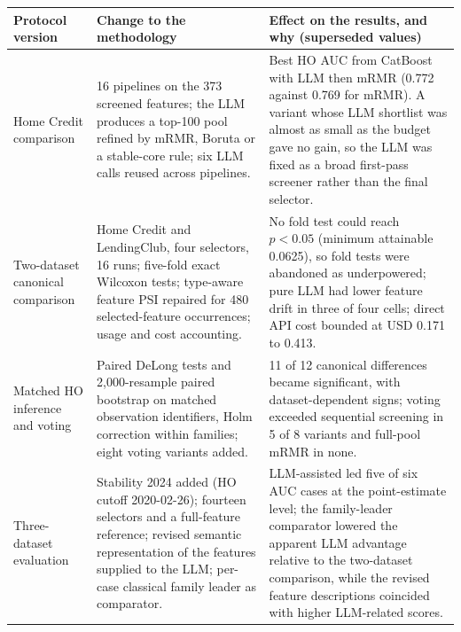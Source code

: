 \documentclass[final,5p,twocolumn]{elsarticle}
\providecommand{\DIFaddbeginFL}{} %
\providecommand{\DIFdelendFL}{} %
\begin{document}
\begin{table}[htbp]
\begin{threeparttable}
\DIFdelendFL \DIFaddbeginFL \label{tab:stages}
\begin{tabular}{@{}L{27mm}L{\dimexpr(\textwidth-27mm-4\tabcolsep)/2\relax}L{\dimexpr(\textwidth-27mm-4\tabcolsep)/2\relax}@{}}
\toprule
Protocol version & Change to the methodology & Effect on the results, and why (superseded values) \\
\midrule
Home Credit comparison & 16 pipelines on the 373 screened features; the LLM produces a top-100 pool refined by mRMR, Boruta or a stable-core rule; six LLM calls reused across pipelines. & Best HO AUC from CatBoost with LLM then mRMR (0.772 against 0.769 for mRMR). A variant whose LLM shortlist was almost as small as the budget gave no gain, so the LLM was fixed as a broad first-pass screener rather than the final selector. \\
\addlinespace
Two-dataset canonical comparison & Home Credit and LendingClub, four selectors, 16 runs; five-fold exact Wilcoxon tests; type-aware feature PSI repaired for 480 selected-feature occurrences; usage and cost accounting. & No fold test could reach $p<0.05$ (minimum attainable 0.0625), so fold tests were abandoned as underpowered; pure LLM had lower feature drift in three of four cells; direct API cost bounded at USD 0.171 to 0.413. \\
\addlinespace
Matched HO inference and voting & Paired DeLong tests and 2,000-resample paired bootstrap on matched observation identifiers, Holm correction within families; eight voting variants added. & 11 of 12 canonical differences became significant, with dataset-dependent signs; voting exceeded sequential screening in 5 of 8 variants and full-pool mRMR in none. \\
\addlinespace
Three-dataset evaluation & Stability 2024 added (HO cutoff 2020-02-26); fourteen selectors and a full-feature reference; revised semantic representation of the features supplied to the LLM; per-case classical family leader as comparator. & LLM-assisted led five of six AUC cases at the point-estimate level; the family-leader comparator lowered the apparent LLM advantage relative to the two-dataset comparison, while the revised feature descriptions coincided with higher LLM-related scores. \\

\end{tabular}
\end{threeparttable}
\end{table}
\end{document}

